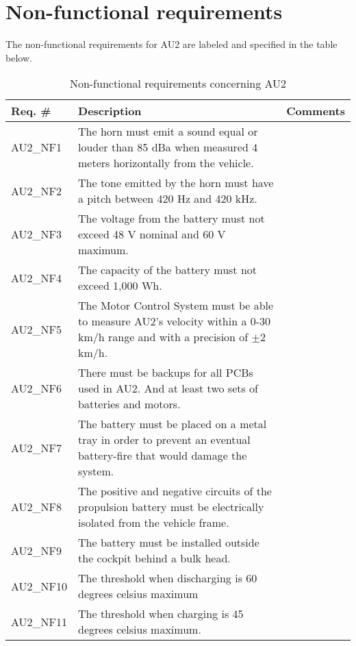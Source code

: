 \section{Non-functional requirements}
The non-functional requirements for AU2 are labeled and specified in the table below\cite{ShellRequirements}.

\begin{table}[h!]
	\centering
	\label{my-label}
	\begin{tabular}{|p{2 cm}|p{7 cm}|p{4 cm}|}
		\hline
		\textbf{Req. \#} & \textbf{Description} & \textbf{Comments} \\\hline
		AU2\_NF1	& The horn must emit a sound equal or louder than 85 dBa when measured 4 meters horizontally from the vehicle. &	\\\hline
		AU2\_NF2	& The tone emitted by the horn must have a pitch between 420 Hz and 420 kHz. &	\\\hline
		AU2\_NF3	& The voltage from the battery must not exceed 48 V nominal and 60 V maximum. &	\\\hline
		AU2\_NF4	& The capacity of the battery must not exceed 1,000 Wh. &	\\\hline
		AU2\_NF5	& The Motor Control System must be able to measure AU2's velocity within a 0-30 km/h range and with a precision of $\pm$2 km/h. &	\\\hline
		AU2\_NF6	& There must be backups for all PCBs used in AU2. And at least two sets of batteries and motors. &	\\\hline
		AU2\_NF7	& The battery must be placed on a metal tray in order to prevent an eventual battery-fire that would damage the system. &   \\\hline
		AU2\_NF8	& The positive and negative circuits of the propulsion battery must be electrically isolated from the vehicle frame. &   \\\hline
		AU2\_NF9	& The battery must be installed outside the cockpit behind a bulk head. &   \\\hline
		AU2\_NF10	& The threshold when discharging is 60 degrees celsius maximum &   \\\hline
		AU2\_NF11	& The threshold when charging is 45 degrees celsius maximum. &   \\\hline
	\end{tabular}
	\caption{Non-functional requirements concerning AU2}
\end{table}
